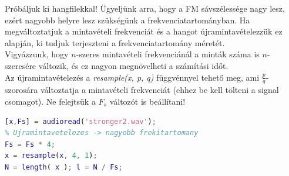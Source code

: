 \documentclass[12pt,a4paper]{article}
\begin{document}
Próbáljuk ki hangfilekkal! Ügyeljünk arra, hogy a FM sávszélessége nagy lesz, ezért nagyobb helyre lesz szükségünk a frekvenciatartományban. Ha megváltoztatjuk a mintavételi frekvenciát és a hangot újramintavételezzük ez alapján, ki tudjuk terjeszteni a frekvenciatartomány méretét. \\
Vigyázzunk, hogy $n$-szeres mintavételi frekvenciánál a minták száma is $n$-szeresére változik, és ez nagyon megnövelheti a számítási időt. \\
Az újramintavételezés a \textit{resample(x, p, q)} függvénnyel tehető meg, ami $\frac{p}{q}$-szorosára változtatja a mintavételi frekvenciát (ehhez be kell tölteni a signal csomagot). Ne felejtsük a $F_s$ változót is beállítani!
\begin{lstlisting}[frame=single,language=matlab,caption=Újramintavételezés]
[x,Fs] = audioread('stronger2.wav');
% Ujramintavetelezes -> nagyobb frekitartomany
Fs = Fs * 4;
x = resample(x, 4, 1);
N = length( x ); l = N / Fs;
\end{lstlisting}
\end{document}
